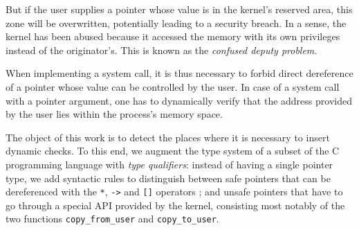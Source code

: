 But if the user supplies a pointer whose value is in the kernel's reserved area,
this zone will be overwritten, potentially leading to a security breach. In a
sense, the kernel has been abused because it accessed the memory with its own
privileges instead of the originator's. This is known as the \emph{confused
deputy problem}\cite{hardy88confused}.

When implementing a system call, it is thus necessary to forbid direct
dereference of a pointer whose value can be controlled by the user. In case of a
system call with a pointer argument, one has to dynamically verify that the
address provided by the user lies within the process's memory space.

The object of this work is to detect the places where it is necessary to insert
dynamic checks. To this end, we augment the type system of a subset of the C
programming language with \emph{type qualifiers}: instead of having a single
pointer type, we add syntactic rules to distinguish between safe pointers that
can be dereferenced with the \texttt{*}, \texttt{->} and \texttt{[]} operators ;
and unsafe pointers that have to go through a special API provided by the
kernel, consisting most notably of the two functions \texttt{copy\_from\_user}
and \texttt{copy\_to\_user}.


